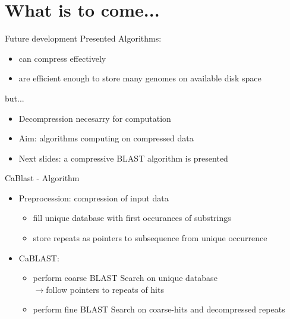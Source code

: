 \documentclass[aspectratio=1610]{beamer}
\begin{document}
\section{What is to come...}
\begin{frame}{Future development}
  Presented Algorithms:
  \begin{itemize}
  \item  can compress effectively
  \item  are efficient enough to store many genomes on available disk space
\end{itemize}
but...
\begin{itemize}
  \item  Decompression necesarry for computation
  \item  Aim: algorithms computing on compressed data
  \item  Next slides: a compressive BLAST algorithm is presented
  \end{itemize}
\end{frame}

\begin{frame}{CaBlast - Algorithm}
  \begin{itemize}
    \item  Preprocession: compression of input data
      \begin{itemize}
        \item fill unique database with first occurances of substrings
        \item store repeats as pointers to subsequence from unique occurrence
      \end{itemize}
    \item CaBLAST:
      \begin{itemize}
        \item perform coarse BLAST Search on unique database \\
          $\rightarrow$follow pointers to repeats of hits
        \item perform fine BLAST Search on coarse-hits and decompressed repeats
      \end{itemize}
  \end{itemize}
\end{frame}
\end{document}
